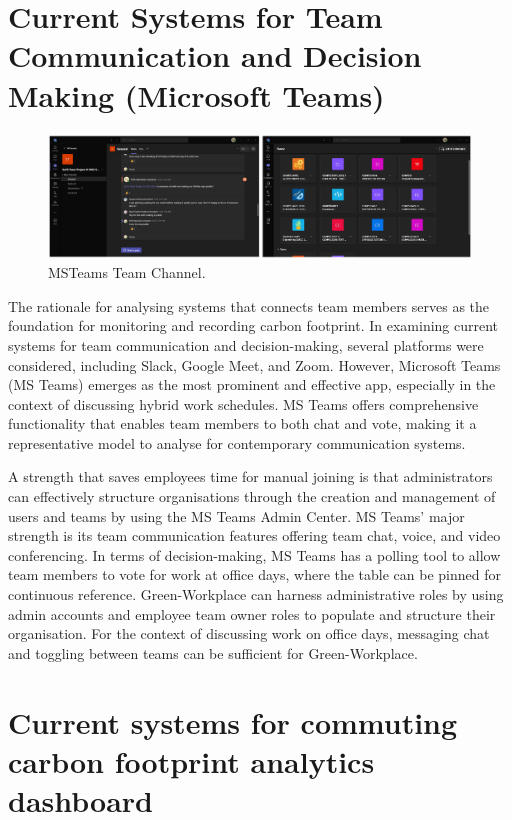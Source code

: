 \documentclass{l4proj}
\begin{document}
\section{Current Systems for Team Communication and Decision Making (Microsoft Teams)}

\begin{figure}[ht]
  \centering
  \includegraphics[width=\linewidth]{images/MSTeams.png}
  \caption{MSTeams Team Channel.}
  \label{fig:msteams}
\end{figure}

The rationale for analysing systems that connects team members serves as the foundation for monitoring and recording carbon footprint. In examining current systems for team communication and decision-making, several platforms were considered, including Slack, Google Meet, and Zoom. However, Microsoft Teams (MS Teams) emerges as the most prominent and effective app, especially in the context of discussing hybrid work schedules. MS Teams offers comprehensive functionality that enables team members to both chat and vote, making it a representative model to analyse for contemporary communication systems.

A strength that saves employees time for manual joining is that administrators can effectively structure organisations through the creation and management of users and teams by using the MS Teams Admin Center. MS Teams' major strength is its team communication features offering team chat, voice, and video conferencing. In terms of decision-making, MS Teams has a polling tool to allow team members to vote for work at office days, where the table can be pinned for continuous reference. Green-Workplace can harness administrative roles by using admin accounts and employee team owner roles to populate and structure their organisation. For the context of discussing work on office days, messaging chat and toggling between teams can be sufficient for Green-Workplace. 
    
\section{Current systems for commuting carbon footprint analytics dashboard}
\end{document}
